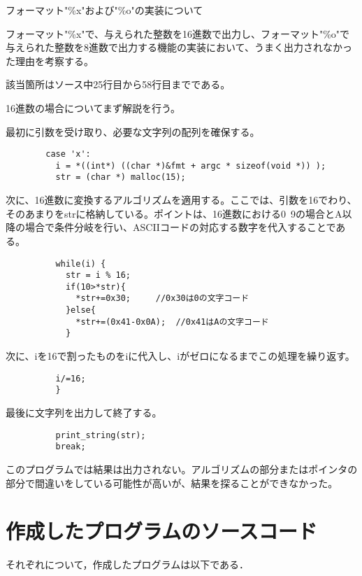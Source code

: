 \documentclass[a4j]{jarticle}
\begin{document}
フォーマット"\%x"および"\%o"の実装について

フォーマット"\%x"で、与えられた整数を16進数で出力し、フォーマット"\%o"で与えられた整数を8進数で出力する機能の実装において、うまく出力されなかった理由を考察する。

該当箇所はソース中25行目から58行目までである。

16進数の場合についてまず解説を行う。

最初に引数を受け取り、必要な文字列の配列を確保する。

\begin{verbatim}
        case 'x':
          i = *((int*) ((char *)&fmt + argc * sizeof(void *)) );
          str = (char *) malloc(15);
\end{verbatim}

次に、16進数に変換するアルゴリズムを適用する。ここでは、引数を16でわり、そのあまりをstrに格納している。ポイントは、16進数における0~9の場合とA以降の場合で条件分岐を行い、ASCIIコードの対応する数字を代入することである。

\begin{verbatim}
          while(i) {
            str = i % 16;
            if(10>*str){
              *str+=0x30;     //0x30は0の文字コード
            }else{
              *str+=(0x41-0x0A);  //0x41はAの文字コード
            }
\end{verbatim}

次に、iを16で割ったものをiに代入し、iがゼロになるまでこの処理を繰り返す。

\begin{verbatim}
          i/=16;
          }
\end{verbatim}

最後に文字列を出力して終了する。

\begin{verbatim}
          print_string(str);
          break;
\end{verbatim}

このプログラムでは結果は出力されない。アルゴリズムの部分またはポインタの部分で間違いをしている可能性が高いが、結果を探ることができなかった。



\newpage

%
%

\section{作成したプログラムのソースコード}

それぞれについて，作成したプログラムは以下である．
\end{document}
